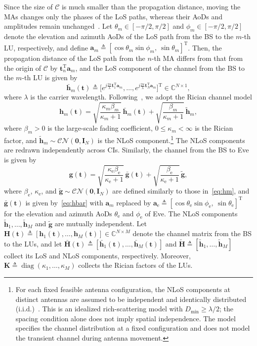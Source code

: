 \documentclass[journal]{IEEEtran}
\newcommand{\CN}{\mathcal{CN}}
\newcommand{\diag}{\operatorname{diag}}
\newcommand{\bt}{\mathbf{t}}
\newcommand{\bh}{\mathbf{h}}
\newcommand{\bg}{\mathbf{g}}
\newcommand{\hb}{\bar{\mathbf{h}}}
\newcommand{\gb}{\bar{\mathbf{g}}}
\newcommand{\htl}{\tilde{\mathbf{h}}}
\newcommand{\gtl}{\tilde{\mathbf{g}}}
\newcommand{\bH}{\mathbf{H}}
\newcommand{\Hb}{\bar{\mathbf{H}}}
\newcommand{\Htl}{\tilde{\mathbf{H}}}
\newcommand{\bK}{\mathbf{K}}
\newcommand{\bI}{\mathbf{I}}
\newcommand{\ba}{\mathbf{a}}
\newcommand{\Dmin}{D_{\mathrm{min}}}
\begin{document}
Since the size of $\mathcal C$ is much smaller than the propagation distance, moving the MAs changes only the phases of the LoS paths, whereas their AoDs and amplitudes remain unchanged~\cite{ZhuTWC2024Model}. Let $\theta_m\in[-\pi/2,\pi/2]$ and $\phi_m\in[-\pi/2,\pi/2]$ denote the elevation and azimuth AoDs of the LoS path from the BS to the $m$-th LU, respectively, and define $\ba_m\triangleq[\cos\theta_m\sin\phi_m,\ \sin\theta_m]^{\mathrm{T}}$. Then, the propagation distance of the LoS path from the $n$-th MA differs from that from the origin of $\mathcal C$ by $\bt_n^{\mathrm{T}}\ba_m$, and the LoS component of the channel from the BS to the $m$-th LU is given by~\cite{ZhengTCOM2025}
\begin{equation}\label{eq:hbar}
\hb_m(\bt)\triangleq\Big[e^{j\frac{2\pi}{\lambda}\bt_1^{\mathrm{T}}\ba_m},\ldots,e^{j\frac{2\pi}{\lambda}\bt_N^{\mathrm{T}}\ba_m}\Big]^{\mathrm{T}}\in\mathbb C^{N\times1},
\end{equation}
where $\lambda$ is the carrier wavelength. Following~\cite{ZhengTCOM2025,HuTVT2025}, we adopt the Rician channel model
\begin{equation}\label{eq:hm}
\bh_m(\bt)=\sqrt{\frac{\kappa_m\beta_m}{\kappa_m+1}}\,\hb_m(\bt)+\sqrt{\frac{\beta_m}{\kappa_m+1}}\,\htl_m,
\end{equation}
where $\beta_m>0$ is the large-scale fading coefficient, $0\le\kappa_m<\infty$ is the Rician factor, and $\htl_m\sim\CN(\mathbf 0,\bI_N)$ is the NLoS component.\footnote{For each fixed feasible antenna configuration, the NLoS components at distinct antennas are assumed to be independent and identically distributed (i.i.d.)~\cite{ZhengTCOM2025,HuTVT2025}. This is an idealized rich-scattering model with $\Dmin\ge\lambda/2$; the spacing condition alone does not imply spatial independence. The model specifies the channel distribution at a fixed configuration and does not model the transient channel during antenna movement.} The NLoS components are redrawn independently across CIs. Similarly, the channel from the BS to Eve is given by
\begin{equation}\label{eq:g}
\bg(\bt)=\sqrt{\frac{\kappa_{\mathrm{e}}\beta_{\mathrm{e}}}{\kappa_{\mathrm{e}}+1}}\,\gb(\bt)+\sqrt{\frac{\beta_{\mathrm{e}}}{\kappa_{\mathrm{e}}+1}}\,\gtl,
\end{equation}
where $\beta_{\mathrm{e}}$, $\kappa_{\mathrm{e}}$, and $\gtl\sim\CN(\mathbf 0,\bI_N)$ are defined similarly to those in~\eqref{eq:hm}, and $\gb(\bt)$ is given by~\eqref{eq:hbar} with $\ba_m$ replaced by $\ba_{\mathrm{e}}\triangleq[\cos\theta_{\mathrm{e}}\sin\phi_{\mathrm{e}},\ \sin\theta_{\mathrm{e}}]^{\mathrm{T}}$ for the elevation and azimuth AoDs $\theta_{\mathrm{e}}$ and $\phi_{\mathrm{e}}$ of Eve. The NLoS components $\htl_1,\ldots,\htl_M$ and $\gtl$ are mutually independent. Let $\bH(\bt)\triangleq[\bh_1(\bt),\ldots,\bh_M(\bt)]\in\mathbb C^{N\times M}$ denote the channel matrix from the BS to the LUs, and let $\Hb(\bt)\triangleq[\hb_1(\bt),\ldots,\hb_M(\bt)]$ and $\Htl\triangleq[\htl_1,\ldots,\htl_M]$ collect its LoS and NLoS components, respectively. Moreover, $\bK\triangleq\diag(\kappa_1,\ldots,\kappa_M)$ collects the Rician factors of the LUs.
\end{document}
